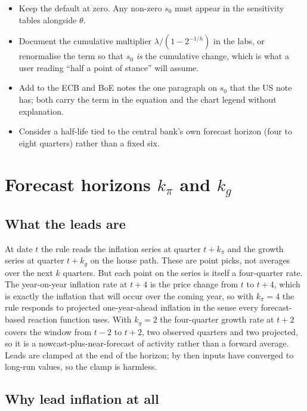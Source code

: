 \documentclass[11pt,a4paper]{article}
\begin{document}
\begin{itemize}
\item Keep the default at zero. Any non-zero $s_0$ must appear in the sensitivity tables alongside $\theta$.
\item Document the cumulative multiplier $\lambda/(1-2^{-1/h})$ in the labs, or renormalise the term so that $s_0$ \emph{is} the cumulative change, which is what a user reading ``half a point of stance'' will assume.
\item Add to the ECB and BoE notes the one paragraph on $s_0$ that the US note has; both carry the term in the equation and the chart legend without explanation.
\item Consider a half-life tied to the central bank's own forecast horizon (four to eight quarters) rather than a fixed six.
\end{itemize}

\section{Forecast horizons \texorpdfstring{$k_\pi$ and $k_g$}{k\_pi and k\_g}}
\label{sec:leads}

\subsection{What the leads are}

At date $t$ the rule reads the inflation series at quarter $t+k_\pi$ and the growth series at quarter $t+k_g$ on the house path. These are point picks, not averages over the next $k$ quarters. But each point on the series is itself a four-quarter rate. The year-on-year inflation rate at $t+4$ is the price change from $t$ to $t+4$, which is exactly the inflation that will occur over the coming year, so with $k_\pi=4$ the rule responds to projected one-year-ahead inflation in the sense every forecast-based reaction function uses. With $k_g=2$ the four-quarter growth rate at $t+2$ covers the window from $t-2$ to $t+2$, two observed quarters and two projected, so it is a nowcast-plus-near-forecast of activity rather than a forward average. Leads are clamped at the end of the horizon; by then inputs have converged to long-run values, so the clamp is harmless.

\subsection{Why lead inflation at all}
\end{document}

